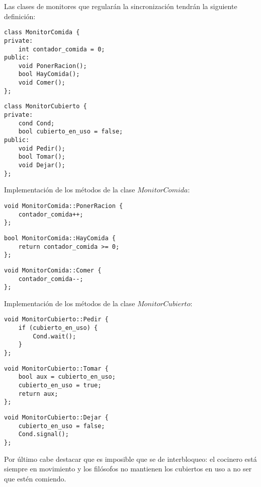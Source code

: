 \documentclass[11pt,a4paper]{article}
\begin{document}
\begin{enumerate}
Las clases de monitores que regularán la sincronización tendrán la siguiente definición: 

\begin{lstlisting}
class MonitorComida {
private:
	int contador_comida = 0;
public:
	void PonerRacion();
	bool HayComida();
	void Comer();
};
\end{lstlisting}

\begin{lstlisting}
class MonitorCubierto {
private:
	cond Cond;
	bool cubierto_en_uso = false;
public:
	void Pedir();
	bool Tomar();
	void Dejar();
};
\end{lstlisting}

Implementación de los métodos de la clase $MonitorComida$:

\begin{lstlisting}
void MonitorComida::PonerRacion {
	contador_comida++;
};
\end{lstlisting}

\begin{lstlisting}
bool MonitorComida::HayComida {
	return contador_comida >= 0;
};
\end{lstlisting}

\begin{lstlisting}
void MonitorComida::Comer {
	contador_comida--;
};
\end{lstlisting}

Implementación de los métodos de la clase $MonitorCubierto$:

\begin{lstlisting}
void MonitorCubierto::Pedir {
	if (cubierto_en_uso) {
		Cond.wait();
	}
};
\end{lstlisting}

\begin{lstlisting}
void MonitorCubierto::Tomar {
	bool aux = cubierto_en_uso;
	cubierto_en_uso = true;
	return aux;
};
\end{lstlisting}

\begin{lstlisting}
void MonitorCubierto::Dejar {
	cubierto_en_uso = false;
	Cond.signal();
};
\end{lstlisting}

Por último cabe destacar que es imposible que se de interbloqueo: el cocinero está siempre en movimiento y los filósofos no mantienen los cubiertos en uso a no ser que estén comiendo.

\end{enumerate}
\end{document}
